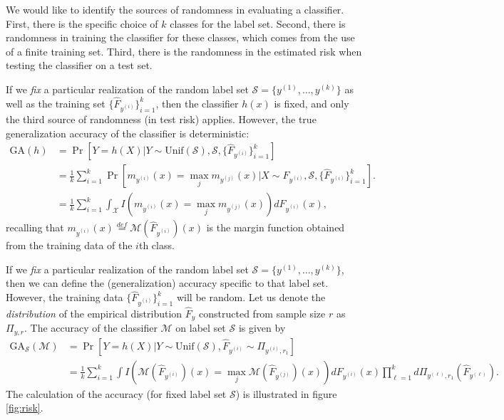 We would like to identify the sources of randomness in evaluating a
classifier.  First, there is the specific choice of $k$ classes for
the label set.   Second, there is randomness in training the classifier
for these classes, which comes from the use of a finite training
set. Third, there is the randomness in the estimated risk when
testing the classifier on a test set.

If we \emph{fix} a particular realization of the random label set
$\mathcal{S} = \{y^{(1)}, \hdots, y^{(k)}\}$ as well as the training
set $\{\hat{F}_{y^{(i)}}\}_{i=1}^k$, then the classifier $h(x)$ is
fixed, and only the third source of randomness (in test risk) applies.
However, the true generalization accuracy of the classifier is deterministic:
\begin{align*}
\text{GA}(h) &= \Pr[Y = h(X)|Y \sim \text{Unif}(\mathcal{S}),
  \mathcal{S}, \{\hat{F}_{y^{(i)}}\}_{i=1}^k] 
\\&= \frac{1}{k}
\sum_{i=1}^k \Pr[m_{y^{(i)}}(x) = \max_j m_{y^{(j)}}(x)|X \sim
  F_{y^{(i)}}, \mathcal{S}, \{\hat{F}_{y^{(i)}}\}_{i=1}^k].  
\\&= \frac{1}{k}
\sum_{i=1}^k \int_{\mathcal{X}} I(m_{y^{(i)}}(x) = \max_j m_{y^{(j)}}(x)) dF_{y^{(i)}}(x),
\end{align*}
recalling that $m_{y^{(i)}}(x) \stackrel{def}{=}
\mathcal{M}(\hat{F}_{y^{(i)}})(x)$ is the margin function obtained
from the training data of the $i$th class.

If we \emph{fix} a particular realization of the random label set
$\mathcal{S} = \{y^{(1)}, \hdots, y^{(k)}\}$, then we can define the
(generalization) accuracy specific to that label set.  However, the
training data $\{\hat{F}_{y^{(i)}}\}_{i=1}^k$ will be random.  Let us
denote the \emph{distribution} of the empirical distribution
$\hat{F}_y$ constructed from sample size $r$ as $\Pi_{y, r}$.  The
accuracy of the classifier $\mathcal{M}$ on label set $\mathcal{S}$ is
given by
\begin{align*}
\text{GA}_{\mathcal{S}}(\mathcal{M}) &= \Pr[Y = h(X)|Y \sim
  \text{Unif}(\mathcal{S}), \hat{F}_{y^{(i)}} \sim \Pi_{y^{(i)}, r_1}] \\&= \frac{1}{k} \sum_{i=1}^k \int
I(\mathcal{M}(\hat{F}_{y^{(i)}})(x) = \max_j
\mathcal{M}(\hat{F}_{y^{(j)}})(x)) dF_{y^{(i)}}(x) \prod_{\ell=1}^k
d\Pi_{y^{(\ell)}, r_1}(\hat{F}_{y^{(\ell)}}).
\end{align*}
The calculation of the accuracy (for fixed label set $\mathcal{S}$) is
illustrated in figure \ref{fig:risk}.

